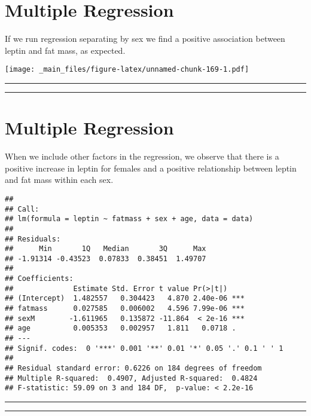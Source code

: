 \documentclass[
]{book}
\begin{document}
\hypertarget{multiple-regression-3}{%
\section{Multiple Regression}\label{multiple-regression-3}}

If we run regression separating by sex we find a positive association between leptin and fat mass, as expected.

\texttt{[image: \_main\_files/figure-latex/unnamed-chunk-169-1.pdf]}

\begin{center}\rule{0.5\linewidth}{0.5pt}\end{center}

\begin{center}\rule{0.5\linewidth}{0.5pt}\end{center}

\hypertarget{multiple-regression-4}{%
\section{Multiple Regression}\label{multiple-regression-4}}

When we include other factors in the regression, we observe that there is a positive increase in leptin for females and a positive relationship between leptin and fat mass within each sex.

\begin{verbatim}
## 
## Call:
## lm(formula = leptin ~ fatmass + sex + age, data = data)
## 
## Residuals:
##      Min       1Q   Median       3Q      Max 
## -1.91314 -0.43523  0.07833  0.38451  1.49707 
## 
## Coefficients:
##              Estimate Std. Error t value Pr(>|t|)    
## (Intercept)  1.482557   0.304423   4.870 2.40e-06 ***
## fatmass      0.027585   0.006002   4.596 7.99e-06 ***
## sexM        -1.611965   0.135872 -11.864  < 2e-16 ***
## age          0.005353   0.002957   1.811   0.0718 .  
## ---
## Signif. codes:  0 '***' 0.001 '**' 0.01 '*' 0.05 '.' 0.1 ' ' 1
## 
## Residual standard error: 0.6226 on 184 degrees of freedom
## Multiple R-squared:  0.4907, Adjusted R-squared:  0.4824 
## F-statistic: 59.09 on 3 and 184 DF,  p-value: < 2.2e-16
\end{verbatim}

\begin{center}\rule{0.5\linewidth}{0.5pt}\end{center}

\begin{center}\rule{0.5\linewidth}{0.5pt}\end{center}
\end{document}

